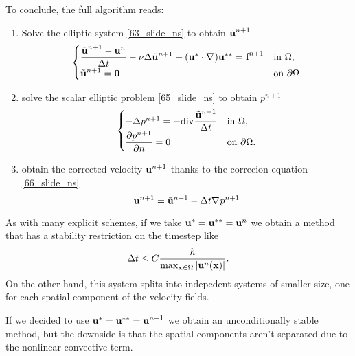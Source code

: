 To conclude, the full algorithm reads: 
\begin{enumerate}
    \item Solve the elliptic system \eqref{63_slide_ns} to obtain \(\tilde{\textbf{u}}^{n+1}\)
    \begin{equation}
        \begin{cases}
            \dfrac{\tilde{\textbf{u}}^{n+1}-\textbf{u}^n}{\Delta t} -\nu\Delta \tilde{\textbf{u}}^{n+1} + (\textbf{u}^* \cdot \nabla\mspace{1mu})\textbf{u}^{**} = \textbf{f}^{n+1} & \text{in }\Omega, \\
            \tilde{\textbf{u}}^{n+1} = \textbf{0} & \text{on }{\partial\Omega}
        \end{cases}
        \label{67_slide_ns}
    \end{equation}
    \item solve the scalar elliptic problem \eqref{65_slide_ns} to obtain \(p^{n+1}\)
    \begin{equation}
        \begin{cases}
            -\Delta p^{n+1} = -\div \dfrac{\tilde{\uvec}^{n+1}}{\tstep} & \txt{in }\Omega, \\
            \displaystyle\partialderivative{p^{n+1}}{n} = 0 & \txt{on }\boundary.
        \end{cases}
        \label{68_slide_ns}
    \end{equation}
    \item obtain the corrected velocity \(\textbf{u}^{n+1}\) thanks to the correcion equation \eqref{66_slide_ns}
    \begin{equation}
        \textbf{u}^{n+1} = \tilde{\textbf{u}}^{n+1} - \Delta t \nabla\mspace{1mu} p^{n+1}
        \label{69_slide_ns}
    \end{equation}
\end{enumerate}
As with many explicit schemes, if we take \(\textbf{u}^* = \textbf{u}^{**} = \textbf{u}^n\) we obtain a method that has a stability restriction on the timestep like 
\[
    \Delta t \leq C \frac{h}{\max_{\textbf{x}\in \Omega}\abs{\textbf{u}^n(\textbf{x})}}.
\]
On the other hand, this system splits into indepedent systems of smaller size, one for each spatial component of the velocity fields.

If we decided to use \(\textbf{u}^* = \textbf{u}^{**} = \textbf{u}^{n+1}\) we obtain an unconditionally stable method, but the downside is that the spatial components aren't separated due to the nonlinear convective term. 